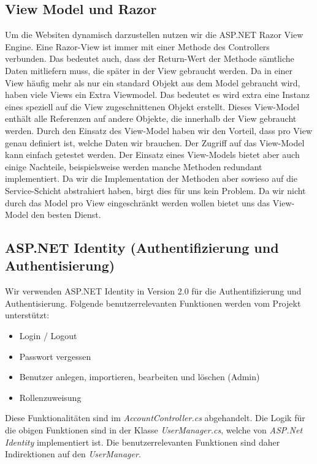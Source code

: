 	\subsection{View Model und Razor}
		Um die Websiten dynamisch darzustellen nutzen wir die ASP.NET Razor View Engine. Eine Razor-View ist immer mit einer Methode des Controllers verbunden. Das bedeutet auch, dass der Return-Wert der Methode sämtliche Daten mitliefern muss, die später in der View gebraucht werden. Da in einer View häufig mehr als nur ein standard Objekt aus dem Model gebraucht wird, haben viele Views ein Extra Viewmodel. Das bedeutet es wird extra eine Instanz eines speziell auf die View zugeschnittenen Objekt erstellt. Dieses View-Model enthält alle Referenzen auf andere Objekte, die innerhalb der View gebraucht werden.
		Durch den Einsatz des View-Model haben wir den Vorteil, dass pro View genau definiert ist, welche Daten wir brauchen. Der Zugriff auf das View-Model kann einfach getestet werden.
		Der Einsatz eines View-Models bietet aber auch einige Nachteile, beispielsweise werden manche Methoden redundant implementiert. Da wir die Implementation der Methoden aber sowieso auf die Service-Schicht abstrahiert haben, birgt dies für uns kein Problem.
		Da wir nicht durch das Model pro View eingeschränkt werden wollen bietet uns das View-Model den besten Dienst.

	\subsection{ASP.NET Identity (Authentifizierung und Authentisierung)}
		Wir verwenden ASP.NET Identity in Version 2.0 für die Authentifizierung und Authentisierung. Folgende benutzerrelevanten Funktionen werden vom Projekt unterstützt:
		\\\begin{itemize}	
			\item Login / Logout
			\item Passwort vergessen
			\item Benutzer anlegen, importieren, bearbeiten und löschen (Admin)
			\item Rollenzuweisung
		\end{itemize}
		Diese Funktionalitäten sind im \textit{AccountController.cs} abgehandelt. Die Logik für die obigen Funktionen sind in der Klasse \textit{UserManager.cs}, welche von \textit{ASP.Net Identity} implementiert ist. Die benutzerrelevanten Funktionen sind daher Indirektionen auf den \textit{UserManager}.

